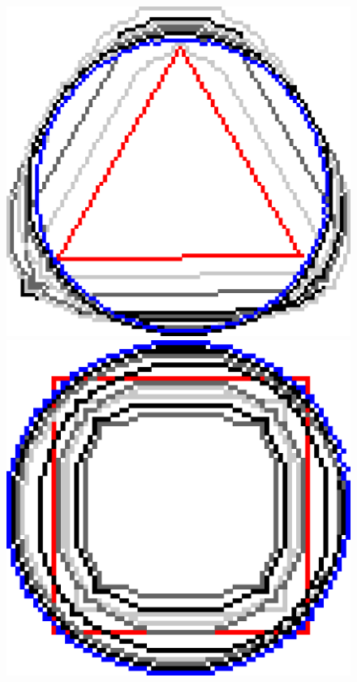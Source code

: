 \begin{figure}[!h]
\center
\begin{minipage}[b]{0.5\textwidth}
\center
	\includegraphics[scale=0.185]{figures/chapter5/exhaustive-selection/ii-r5-lp0.01/triangle/summary.pdf}\\[2em]
	
	\includegraphics[scale=0.17]{figures/chapter5/exhaustive-selection/ii-r5-lp0.01/square/summary.pdf}\\[2em]


\end{minipage}
\end{figure}
